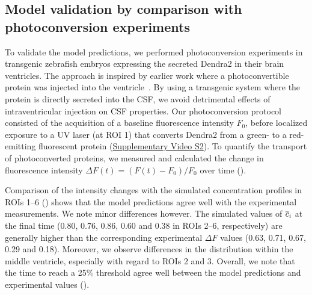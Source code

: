 \documentclass{WileyMSP-template}
\begin{document}
\subsection{Model validation by comparison with photoconversion experiments}

To validate the model predictions, we performed photoconversion
experiments in transgenic zebrafish embryos expressing the secreted
Dendra2 in their brain ventricles. The approach is inspired by earlier work
where a photoconvertible protein was injected into the ventricle~\cite{fame2016directional}.
By using a transgenic system where the protein is directly secreted into the CSF,
we avoid detrimental effects of intraventricular injection on CSF properties. 
Our photoconversion protocol
consisted of the acquisition of a baseline fluorescence intensity
$F_0$, before localized exposure to a UV laser (at ROI 1) that
converts Dendra2 from a green- to a red-emitting fluorescent
protein (\href{https://doi.org/10.5281/zenodo.15194757}{Supplementary Video S2}).
To quantify the transport of photoconverted proteins, we
measured and calculated the change in fluorescence intensity $\Delta F(t)
= (F(t)-F_0)/F_0$ over time ().

Comparison of the intensity changes with the simulated concentration
profiles in ROIs 1--6 () shows that the
model predictions agree well with the experimental measurements. We
note minor differences however. The simulated values of $\overline{c}_i$ at
the final time (0.80, 0.76, 0.86, 0.60 and 0.38 in ROIs 2--6, respectively)
are generally higher than the corresponding experimental $\Delta F$
values (0.63, 0.71, 0.67, 0.29 and 0.18). Moreover, we observe
differences in the distribution within the middle ventricle,
especially with regard to ROIs 2 and 3. Overall, we note that the time
to reach a 25\% threshold agree well between the model predictions and
experimental values ().
\end{document}
